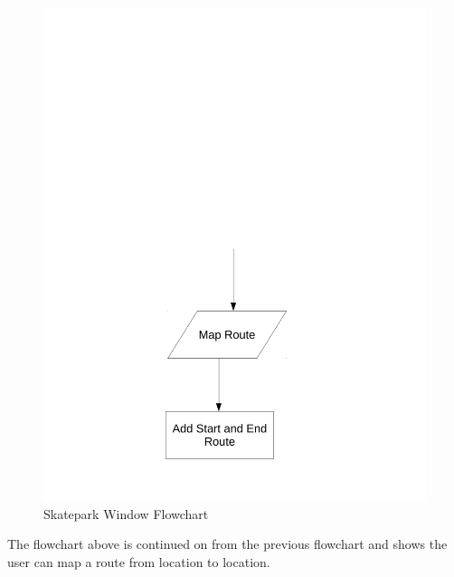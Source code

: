 \begin{figure}[H]
    \includegraphics[width=\textwidth]{./Design/SkateparkFlowchart2.pdf}
    \caption{Skatepark Window Flowchart} \label{fig:Skatepark Flowchart}
\end{figure}

The flowchart above is continued on from the previous flowchart and shows the user can map a route from location to location.


